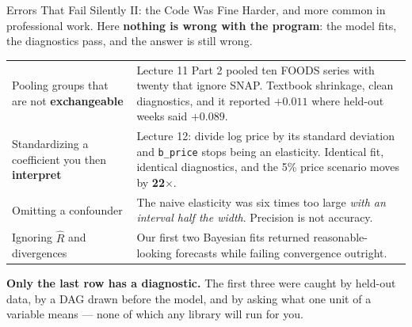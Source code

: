 \documentclass[aspectratio=169, 11pt]{beamer}
\begin{document}
\begin{frame}{Errors That Fail Silently II: the Code Was Fine}
  Harder, and more common in professional work. Here \textbf{nothing is wrong with the program}:
  the model fits, the diagnostics pass, and the answer is still wrong.
  \begin{center}
    {\small
    \begin{tabular}{p{3.7cm}p{8.6cm}}
      \toprule
      Pooling groups that are not \textbf{exchangeable} & Lecture 11 Part 2 pooled ten FOODS
      series with twenty that ignore SNAP. Textbook shrinkage, clean diagnostics, and it reported
      $+0.011$ where held-out weeks said $+0.089$. \\[3pt]
      Standardizing a coefficient you then \textbf{interpret} & Lecture 12: divide log price by
      its standard deviation and \texttt{b\_price} stops being an elasticity. Identical fit,
      identical diagnostics, and the 5\% price scenario moves by \textbf{22$\times$}. \\[3pt]
      Omitting a confounder & The naive elasticity was six times too large \emph{with an interval
      half the width}. Precision is not accuracy. \\[3pt]
      Ignoring $\hat{R}$ and divergences & Our first two Bayesian fits returned
      reasonable-looking forecasts while failing convergence outright. \\
      \bottomrule
    \end{tabular}
    }
  \end{center}

  \vspace{-0.05cm}
  \textbf{Only the last row has a diagnostic.} The first three were caught by held-out data, by a
  DAG drawn before the model, and by asking what one unit of a variable means --- none of which
  any library will run for you.
\end{frame}
\end{document}
